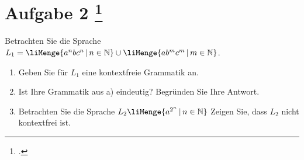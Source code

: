 \documentclass{lehramt-informatik-aufgabe}
\begin{document}
\let\m=\liMenge
{}
\section{Aufgabe 2
\footcite{66115:2017:09}}

Betrachten Sie die Sprache $L_1 = \m{a^n b c^n \, | \, n \in \mathbb{N}} \cup
\m{a b^m c^m \, | \, m \in \mathbb{N}}$.

\begin{enumerate}


\item Geben Sie für $L_1$ eine kontextfreie Grammatik an.


\item Ist Ihre Grammatik aus a) eindeutig? Begründen Sie Ihre Antwort.


\item Betrachten Sie die Sprache $L_2 \m{a^ {2^n} \, | \, n \in
\mathbb{N}}$ Zeigen Sie, dass $L_2$ nicht kontextfrei ist.
\end{enumerate}
\end{document}
